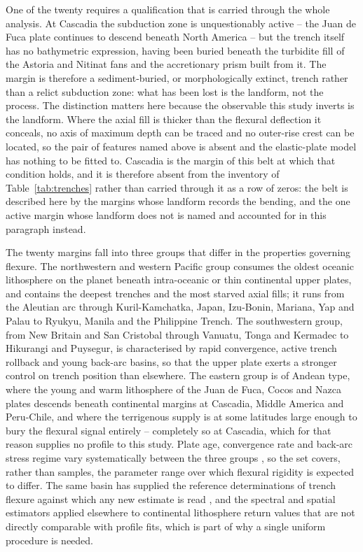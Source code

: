 \documentclass[final]{agujournal2019}
\begin{document}
One of the twenty requires a qualification that is carried through the whole
analysis. At Cascadia the subduction zone is unquestionably active -- the Juan
de Fuca plate continues to descend beneath North America -- but the trench
itself has no bathymetric expression, having been buried beneath the turbidite
fill of the Astoria and Nitinat fans and the accretionary prism built from it.
The margin is therefore a sediment-buried, or morphologically extinct, trench
rather than a relict subduction zone: what has been lost is the landform, not
the process. The distinction matters here because the observable this study
inverts is the landform. Where the axial fill is thicker than the flexural
deflection it conceals, no axis of maximum depth can be traced and no outer-rise
crest can be located, so the pair of features named above is absent and the
elastic-plate model has nothing to be fitted to. Cascadia is the margin of this
belt at which that condition holds, and it is therefore absent from the
inventory of Table~\ref{tab:trenches} rather than carried through it as a row of
zeros: the belt is described here by the margins whose landform records the
bending, and the one active margin whose landform does not is named and
accounted for in this paragraph instead.

The twenty margins fall into three groups that differ in the properties
governing flexure. The northwestern and western Pacific group consumes the
oldest oceanic lithosphere on the planet beneath intra-oceanic or thin
continental upper plates, and contains the deepest trenches and the most starved
axial fills; it runs from the Aleutian arc through Kuril-Kamchatka, Japan,
Izu-Bonin, Mariana, Yap and Palau to Ryukyu, Manila and the Philippine Trench.
The southwestern group, from New Britain and San Cristobal through Vanuatu,
Tonga and Kermadec to Hikurangi and Puysegur, is characterised by rapid
convergence, active trench rollback and young back-arc basins, so that the upper
plate exerts a stronger control on trench position than elsewhere. The eastern
group is of Andean type, where the young and warm lithosphere of the Juan de
Fuca, Cocos and Nazca plates descends beneath continental margins at Cascadia,
Middle America and Peru-Chile, and where the terrigenous supply is at some
latitudes large enough to bury the flexural signal entirely -- completely so at
Cascadia, which for that reason supplies no profile to this study.
Plate age, convergence rate and back-arc stress regime vary systematically
between the three groups \cite{HeuretLallemand2005,DeMets2010,Bird2003}, so the
set covers, rather than samples, the parameter range over which flexural
rigidity is expected to differ. The same basin has supplied the reference
determinations of trench flexure against which any new estimate is read
\cite{LevittSandwell1995,Bodine1981}, and the spectral and spatial estimators
applied elsewhere to continental lithosphere
\cite{StewartWatts1997,WieczorekSimons2005,Zamani2014} return values that are
not directly comparable with profile fits, which is part of why a single
uniform procedure is needed.
\end{document}
